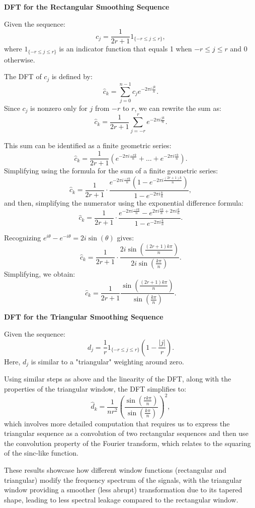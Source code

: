 \documentclass[8pt]{article}
\begin{document}
{\textbf{DFT for the Rectangular Smoothing Sequence}

Given the sequence:
\[ c_j = \frac{1}{2r+1} 1_{\{-r \leq j \leq r\}}, \]
where \(1_{\{-r \leq j \leq r\}}\) is an indicator function that equals 1 when \(-r \leq j \leq r\) and 0 otherwise.

The DFT of \(c_j\) is defined by:
\[ \hat{c}_k = \sum_{j=0}^{n-1} c_j e^{-2\pi i \frac{jk}{n}}. \]
Since \(c_j\) is nonzero only for \(j\) from \(-r\) to \(r\), we can rewrite the sum as:
\[ \hat{c}_k = \frac{1}{2r+1} \sum_{j=-r}^{r} e^{-2\pi i \frac{jk}{n}}. \]

This sum can be identified as a finite geometric series:
\[ \hat{c}_k = \frac{1}{2r+1} \left( e^{-2\pi i \frac{-rk}{n}} + \dots + e^{-2\pi i \frac{rk}{n}} \right). \]
Simplifying using the formula for the sum of a finite geometric series:
\[ \hat{c}_k = \frac{1}{2r+1} \cdot \frac{e^{-2\pi i \frac{-rk}{n}} (1 - e^{-2\pi i \frac{(2r+1)k}{n}})}{1 - e^{-2\pi i \frac{k}{n}}}, \]
and then, simplifying the numerator using the exponential difference formula:
\[ \hat{c}_k = \frac{1}{2r+1} \cdot \frac{e^{-2\pi i \frac{-rk}{n}} - e^{2\pi i \frac{rk}{n} + 2\pi i \frac{k}{n}}}{1 - e^{-2\pi i \frac{k}{n}}}. \]

Recognizing \( e^{i \theta} - e^{-i \theta} = 2i \sin(\theta) \) gives:
\[ \hat{c}_k = \frac{1}{2r+1} \cdot \frac{2i \sin \left(\frac{(2r+1)k\pi}{n}\right)}{2i \sin \left(\frac{k\pi}{n}\right)}. \]
Simplifying, we obtain:
\[ \hat{c}_k = \frac{1}{2r+1} \frac{\sin \left(\frac{(2r+1)k\pi}{n}\right)}{\sin \left(\frac{k\pi}{n}\right)}. \]

\textbf{DFT for the Triangular Smoothing Sequence}

Given the sequence:
\[ d_j = \frac{1}{r} 1_{\{-r \leq j \leq r\}} \left(1 - \frac{|j|}{r}\right). \]
Here, \(d_j\) is similar to a "triangular" weighting around zero.

Using similar steps as above and the linearity of the DFT, along with the properties of the triangular window, the DFT simplifies to:
\[ \hat{d}_k = \frac{1}{nr^2} \left(\frac{\sin \left(\frac{rk\pi}{n}\right)}{\sin \left(\frac{k\pi}{n}\right)}\right)^2, \]
which involves more detailed computation that requires us to express the triangular sequence as a convolution of two rectangular sequences and then use the convolution property of the Fourier transform, which relates to the squaring of the sinc-like function.

These results showcase how different window functions (rectangular and triangular) modify the frequency spectrum of the signals, with the triangular window providing a smoother (less abrupt) transformation due to its tapered shape, leading to less spectral leakage compared to the rectangular window.

}
\end{document}
